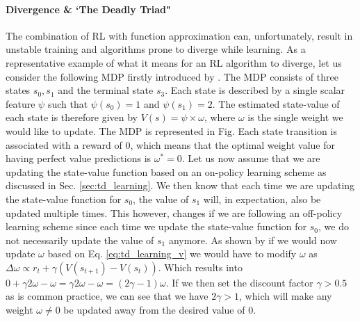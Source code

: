 \paragraph{Divergence \& `The Deadly Triad"}
The combination of RL with function approximation can, unfortunately, result in unstable training and algorithms prone to diverge while learning. As a representative example of what it means for an RL algorithm to diverge, let us consider the following MDP firstly introduced by \citet{tsitsiklis1997analysis}. The MDP consists of three states $s_0, s_1$ and the terminal state $s_3$. Each state is described by a single scalar feature $\psi$ such that $\psi(s_0)=1$ and $\psi(s_1)=2$. The estimated state-value of each state is therefore given by $V(s)=\psi \times \omega$, where $\omega$ is the single weight we would like to update. The MDP is represented in Fig.  Each state transition is associated with a reward of $0$, which means that the optimal weight value for having perfect value predictions is $\omega^{*}=0$. Let us now assume that we are updating the state-value function based on an on-policy learning scheme as discussed in Sec. \ref{sec:td_learning}. We then know that each time we are updating the state-value function for $s_0$, the value of $s_1$ will, in expectation, also be updated multiple times. This however, changes if we are following an off-policy learning scheme since each time we update the state-value function for $s_0$, we do not necessarily update the value of $s_1$ anymore. As shown by \citet{van2018deep_triad} if we would now update $\omega$ based on Eq. \ref{eq:td_learning_v} we would have to modify $\omega$ as $\Delta \omega \propto r_t +\gamma(V(s_{t+1})-V(s_t))$. Which results into $0+\gamma2\omega-\omega=\gamma2\omega-\omega=(2\gamma-1)\omega$. If we then set the discount factor $\gamma>0.5$ as is common practice, we can see that we have $2\gamma>1$, which will make any weight $\omega\neq0$  be updated away from the desired value of $0$.

